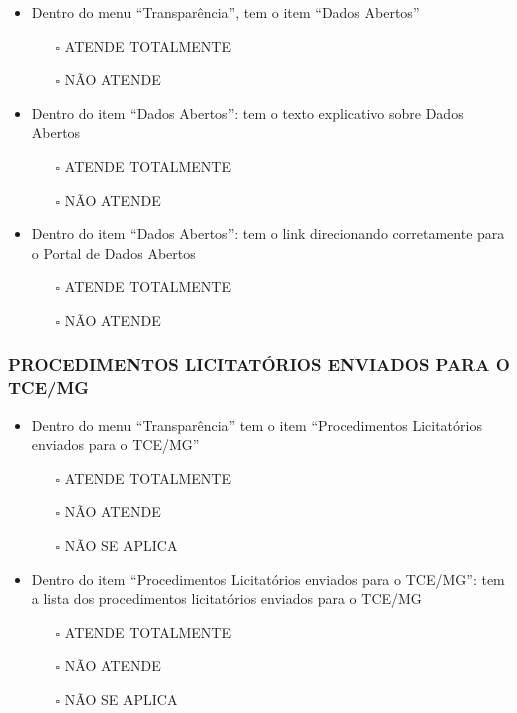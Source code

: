 \documentclass[
]{book}
\providecommand{\tightlist}{%
  \setlength{\itemsep}{0pt}\setlength{\parskip}{0pt}}
\begin{document}
\begin{itemize}
\tightlist
\item
  Dentro do menu ``Transparência'', tem o item ``Dados Abertos''

  \begin{itemize}
  \tightlist
  \item[$\square$]
    ATENDE TOTALMENTE
  \item[$\square$]
    NÃO ATENDE
  \end{itemize}
\item
  Dentro do item ``Dados Abertos'': tem o texto explicativo sobre Dados Abertos

  \begin{itemize}
  \tightlist
  \item[$\square$]
    ATENDE TOTALMENTE
  \item[$\square$]
    NÃO ATENDE
  \end{itemize}
\item
  Dentro do item ``Dados Abertos'': tem o link direcionando corretamente para o Portal de Dados Abertos

  \begin{itemize}
  \tightlist
  \item[$\square$]
    ATENDE TOTALMENTE
  \item[$\square$]
    NÃO ATENDE
  \end{itemize}
\end{itemize}

\hypertarget{procedimentos-licitatuxf3rios-enviados-para-o-tcemg-1}{%
\subsubsection*{PROCEDIMENTOS LICITATÓRIOS ENVIADOS PARA O TCE/MG}\label{procedimentos-licitatuxf3rios-enviados-para-o-tcemg-1}}

\begin{itemize}
\tightlist
\item
  Dentro do menu ``Transparência'' tem o item ``Procedimentos Licitatórios enviados para o TCE/MG''

  \begin{itemize}
  \tightlist
  \item[$\square$]
    ATENDE TOTALMENTE
  \item[$\square$]
    NÃO ATENDE
  \item[$\square$]
    NÃO SE APLICA
  \end{itemize}
\item
  Dentro do item ``Procedimentos Licitatórios enviados para o TCE/MG'': tem a lista dos procedimentos licitatórios enviados para o TCE/MG

  \begin{itemize}
  \tightlist
  \item[$\square$]
    ATENDE TOTALMENTE
  \item[$\square$]
    NÃO ATENDE
  \item[$\square$]
    NÃO SE APLICA
  \end{itemize}
\end{itemize}
\end{document}
